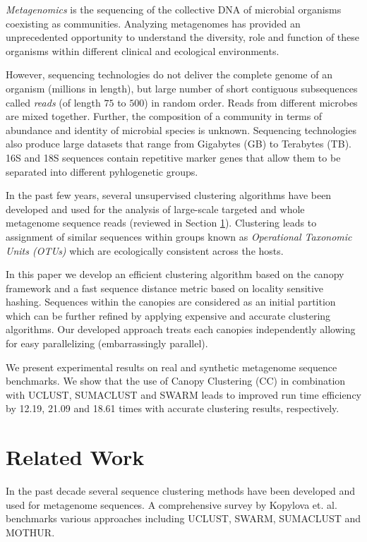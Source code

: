 \documentclass[letterpaper,twocolumn]{article}
\begin{document}
\emph{Metagenomics} is the 
sequencing of the collective DNA  of 
microbial organisms coexisting as communities. Analyzing 
metagenomes has provided an unprecedented 
opportunity to understand the diversity, role and 
function of these organisms within different 
clinical and ecological environments\cite{MARHumanGut}\cite{MARMihaiPop}.

However, sequencing technologies do not deliver the 
complete genome of an organism (millions in length), but 
large number of short contiguous 
subsequences called \emph{reads} (of length $75$ to $500$) in 
random order. Reads 
from different microbes are mixed together. Further, 
the composition of a community in terms of 
abundance and identity of microbial species
is unknown\cite{MARMetaChallenge}. Sequencing technologies also 
produce large 
datasets that range from Gigabytes (GB) to Terabytes (TB). 16S and 18S 
sequences contain repetitive marker genes that allow them to be separated into different 
pyhlogenetic groups\cite{MAR16S}. 

In the past few years, several unsupervised 
clustering algorithms have been developed and
used for the analysis of large-scale targeted and whole 
metagenome sequence reads 
(reviewed in Section \ref{sec:Literature}). Clustering 
leads to assignment of similar sequences within groups known as \emph{Operational Taxonomic Units (OTUs)}\cite{MAROTU} which are ecologically consistent across the hosts\cite{MAROTUConsistant}. 

In this paper we develop an 
efficient clustering algorithm based on the canopy framework\cite{MARCanopy} and a 
fast sequence distance metric based on locality 
sensitive hashing\cite{MARLshRef2}. Sequences within the canopies are 
considered as an initial partition which can be 
further refined by applying expensive and accurate clustering 
algorithms. Our developed approach treats each canopies independently 
allowing for easy parallelizing (embarrassingly parallel). 

We present experimental results on 
real and synthetic metagenome sequence
benchmarks. We show that the 
use of Canopy Clustering (CC) in combination 
with UCLUST\cite{MARuclust}, SUMACLUST\cite{MARSumaclust} and 
SWARM\cite{MARSwarm2} leads to improved run 
time efficiency by 12.19, 21.09 and 18.61 times with accurate clustering results, respectively. 

\section{Related Work}
\label{sec:Literature}
In the past decade several 
sequence clustering methods have been developed and
used  for metagenome sequences. A comprehensive survey 
by Kopylova et. al.\cite{MARopenDeNovo} benchmarks 
various  approaches 
including UCLUST\cite{MARuclust}, SWARM\cite{MARSwarm2}, 
SUMACLUST\cite{MARSumaclust} and MOTHUR\cite{MARMothur}. 
\end{document}
